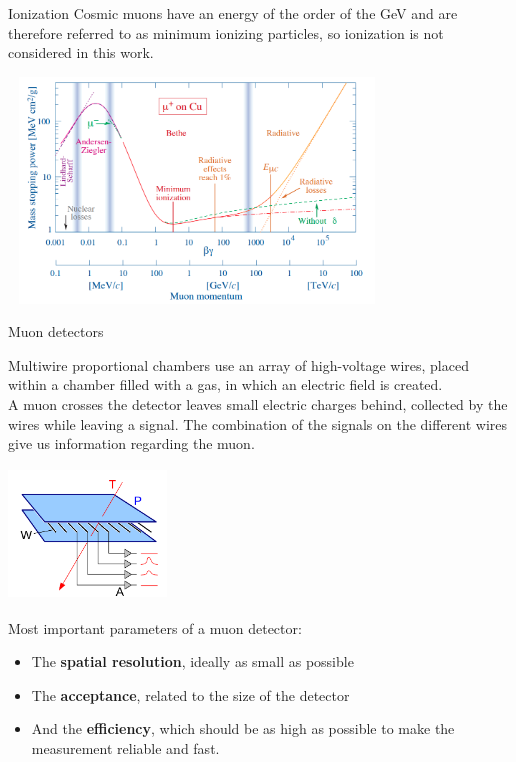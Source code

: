 \documentclass[8 pt]{beamer}
\begin{document}
\begin{frame}{Ionization}
\justifying
Cosmic muons have an energy of the order of the GeV and are therefore referred to as minimum ionizing particles, so ionization is not considered in this work.
\begin{center}
	\includegraphics[width=10cm, height=6cm]{figs/BB.png}
	\end{center}
\end{frame}

\begin{frame}{Muon detectors}
\justifying
\begin{minipage}[c]{.58\textwidth}
\justifying
Multiwire proportional chambers use an array of high-voltage wires, placed within a chamber filled with a gas, in which an electric field is created. \\ \vspace{10pt}
A muon crosses the detector leaves small electric charges behind, collected by the wires while leaving a signal. The combination of the signals on the different wires give us information regarding the muon.
\end{minipage} \hfill
\begin{minipage}[c]{.39\textwidth}
\includegraphics[width=4.2cm, height=3.5cm]{figs/wireChambers.png}
\end{minipage} \hfill \vfill

Most important parameters of a muon detector:
\begin{itemize}
\justifying
\item The \textbf{spatial resolution}, ideally as small as possible
\item The \textbf{acceptance}, related to the size of the detector
\item And the \textbf{efficiency}, which should be as high as possible to make the measurement reliable and fast.
\end{itemize}
\end{frame}
\end{document}
